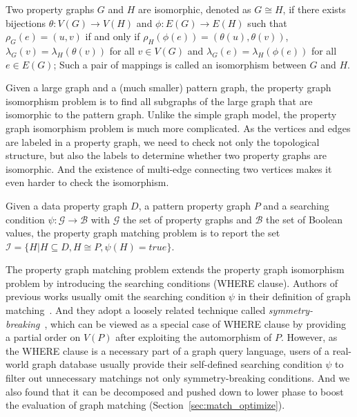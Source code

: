 \begin{definition}
  Two property graphs $G$ and $H$ are isomorphic, denoted as $G \cong H$,
  if there exists bijections $\theta: V(G) \rightarrow V(H)$ and $\phi: E(G) \rightarrow E(H)$ such that
  $\rho_G(e) = (u, v)$ if and only if $\rho_H(\phi(e)) = (\theta(u), \theta(v))$,
  $\lambda_G(v) = \lambda_H(\theta(v))$ for all $v \in V(G)$
  and $\lambda_G(e) = \lambda_H(\phi(e))$ for all $e \in E(G)$;
  Such a pair of mappings is called an isomorphism between $G$ and $H$.
\end{definition}
Given a large graph and a (much smaller) pattern graph,
the property graph isomorphism problem is to find all subgraphs of the large graph that are isomorphic to the pattern graph.
Unlike the simple graph model, the property graph isomorphism problem is much more complicated.
As the vertices and edges are labeled in a property graph, we need to check not only the topological structure,
but also the labels to determine whether two property graphs are isomorphic.
And the existence of multi-edge connecting two vertices makes it even harder to check the isomorphism.
\begin{definition}\label{def:property_graph_matching}
  Given a data property graph $D$, a pattern property graph $P$ and a searching condition $\psi: \mathcal{G} \rightarrow \mathcal{B}$ with $\mathcal{G}$ the set of property graphs and $\mathcal{B}$ the set of Boolean values,
  the property graph matching problem is to report the set $\mathcal{I} = \{H | H \subseteq D, H \cong P, \psi(H) = true\}$.
\end{definition}
The property graph matching problem extends the property graph isomorphism problem by introducing the searching conditions (WHERE clause).
Authors of previous works usually omit the searching condition $\psi$ in their definition of graph matching~\cite{DBLP:conf/sigmod/ShaoCCMYX14,DBLP:journals/pvldb/LaiQLC15,DBLP:conf/sigmod/KimLBHLKJ16,DBLP:journals/pvldb/QiaoZC17}.
And they adopt a loosely related technique called \emph{symmetry-breaking}~\cite{DBLP:conf/recomb/GrochowK07},
which can be viewed as a special case of WHERE clause by providing a partial order on $V(P)$ after exploiting the automorphism of $P$.
However, as the WHERE clause is a necessary part of a graph query language,
users of a real-world graph database usually provide their self-defined searching condition $\psi$ to filter out unnecessary matchings not only symmetry-breaking conditions.
And we also found that it can be decomposed and pushed down to lower phase to boost the evaluation of graph matching (Section~\ref{sec:match_optimize}).
